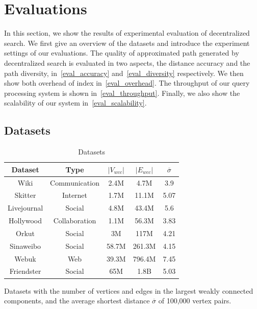 \section{Evaluations}
\label{evaluation}

In this section, we show the results of experimental evaluation of decentralized search. We first give an overview of the datasets and introduce the experiment settings of our evaluations. The quality of approximated path generated by decentralized search is evaluated in two aspects, the distance accuracy and the path diversity, in~\ref{eval_accuracy} and~\ref{eval_diversity} respectively. We then show both overhead of index in~\ref{eval_overhead}. The throughput of our query processing system is shown in~\ref{eval_throughput}. Finally, we also show the scalability of our system in~\ref{eval_scalability}.

\subsection{Datasets}
\label{eval_datasets}

\begin{table}
		\caption{Datasets}
		\vspace{2 mm}
		\label{table:datasets}
		\begin{threeparttable}
			\centering
			\begin{tabular}{c|cccc} \hline
				Dataset & Type & $|V_{wcc}|$ & $|E_{wcc}|$ & $\overline{\sigma}$ \\ \hline
				Wiki & Communication & 2.4M & 4.7M & 3.9 \\ 
				Skitter & Internet & 1.7M & 11.1M & 5.07 \\ 
				Livejournal & Social & 4.8M & 43.4M & 5.6 \\ 
				Hollywood & Collaboration & 1.1M & 56.3M & 3.83 \\ 
				Orkut & Social & 3M & 117M & 4.21 \\ 
				Sinaweibo & Social & 58.7M & 261.3M & 4.15 \\ 
				Webuk & Web & 39.3M & 796.4M & 7.45 \\ 
				Friendster & Social & 65M & 1.8B & 5.03 \\ \hline
			\end{tabular}
			\begin{tablenotes}
				\item Datasets with the number of vertices and edges in the largest weakly connected components, and the average shortest distance $\overline{\sigma}$ of 100,000 vertex pairs.
			\end{tablenotes}
		\end{threeparttable}
\end{table}

